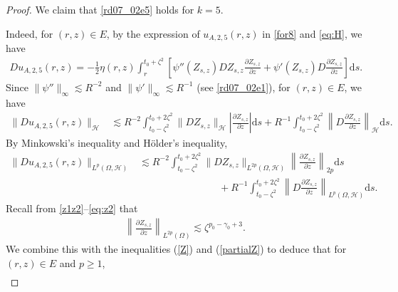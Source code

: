 \documentclass[10pt,a4paper]{amsart}
\newcommand {\deltah}{{\zeta}}
\newcommand{\E}{\mathrm{E}}
\newcommand{\R}{{\mathbb{R}}}
\renewcommand{\d}{\mathrm{d}}
\begin{document}
\begin{proof}
           We claim that \eqref{rd07_02e5} holds for $k=5$. 

Indeed, for $(r,z)\in E$, 
          by the expression of $u_{A,2,5}(r,z)$ in \eqref{for8} and \eqref{eq:H}, we have
          \begin{align*}
          Du_{A,2,5}(r,z) =-\frac12 \eta(r,z)\int_r^{t_0+\deltah^2}\left[\psi''(Z_{s, z})DZ_{s,z} \frac{\partial Z_{s,z}}{\partial z}
          + \psi'(Z_{s, z}) D\frac{\partial Z_{s,z}}{\partial z}\right]
          \d s.
          \end{align*}
Since $\|\psi''\|_{\infty} \lesssim R^{-2}$ and $\|\psi'\|_{\infty} \lesssim R^{-1}$ (see \eqref{rd07_02e1}), for $(r,z)\in E$, we have
 \begin{align*}
          \|Du_{A,2,5}(r,z)\|_{\mathcal{H}} &\lesssim R^{-2}\int_{t_0-\deltah^2}^{t_0+2\deltah^2} \|DZ_{s,z}\|_{\mathcal{H}}
          \left| \frac{\partial Z_{s,z}}{\partial z}\right| \d s 
          + R^{-1}\int_{t_0-\deltah^2}^{t_0+2\deltah^2}
                     \left\|D\frac{\partial Z_{s,z}}{\partial z}\right\|_{\mathcal{H}}\d s. 
\end{align*}
          By Minkowski's inequality and H\"older's inequality, 
          \begin{align*}
          \|Du_{A,2,5}(r,z)\|_{L^{p}(\Omega,\mathcal{H})} &\lesssim R^{-2}\int_{t_0-\deltah^2}^{t_0+2\deltah^2} \|DZ_{s,z}\|_{L^{2p}(\Omega,\mathcal{H})}
          \left\| \frac{\partial Z_{s,z}}{\partial z}\right\|_{2p} \d s\\
          &\qquad\qquad\qquad\qquad+ R^{-1}\int_{t_0-\deltah^2}^{t_0+2\deltah^2}
                     \left\|D\frac{\partial Z_{s,z}}{\partial z}\right\|_{L^p(\Omega, \mathcal{H})}\d s. 
          \end{align*}
          Recall from \eqref{z1z2}--\eqref{eq:z2} that
          \begin{align}\label{mom:partialZ}
                    \left\| \frac{\partial Z_{s,z}}{\partial z}\right\|_{L^{2p}(\Omega)}  \lesssim \deltah^{p_0-\gamma_0+3}.
          \end{align}
          We combine this with the inequalities  (\ref{Z}) and  (\ref{partialZ}) to deduce that 
          for $(r,z)\in E$ and $p\geq1$,
\begin{align*}

\end{align*}
\end{proof}
\end{document}
